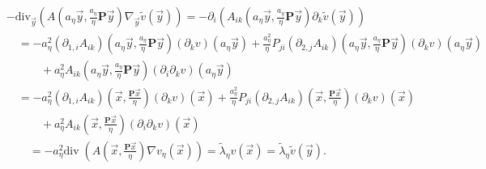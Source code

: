 \documentclass[a4paper,reqno]{amsart}
\numberwithin{equation}{section}
\numberwithin{equation}{section}		%
\numberwithin{figure}{section}			%
\numberwithin{table}{section}				%
\newcommand{\ntodo}[1]{\todo[inline, backgroundcolor=blue!20!white, bordercolor=blue]{Niklas: #1}}
\theoremstyle{definition}
\renewcommand{\tilde}{\widetilde}
\newcommand{\<}{\ensuremath \leq}
\renewcommand{\>}{\ensuremath \geq}
\renewcommand{\tilde}{\widetilde}
\begin{document}
\begin{align*}
    &-\mathrm{div}_{\vec y}\left(A(a_\eta \vec y, \frac{a_\eta}{\eta}\textbf{P}\vec y) \nabla_{\vec y} \tilde{v}(\vec{y})\right) = -  \partial_{i}(A_{ik}(a_\eta \vec y, \frac{a_\eta}{\eta}\textbf{P}\vec y)\partial_{k}\tilde{v}(\vec{y}))\\   
    &\quad =-  a_\eta^2 (\partial_{1,i}A_{ik})(a_\eta \vec y, \frac{a_\eta}{\eta}\textbf{P}\vec y)(\partial_kv)(a_\eta\vec y)
    +  \frac{a_\eta^2}{\eta}  P_{ji}(\partial_{2,j}A_{ik})(a_\eta \vec y, \frac{a_\eta}{\eta}\textbf{P}\vec y)(\partial_kv)(a_\eta\vec y)\\
    &\quad \qquad + a_\eta^2 A_{ik}(a_\eta \vec y, \frac{a_\eta}{\eta}\textbf{P}\vec y)(\partial_i\partial_k v)(a_\eta \vec y)\\
    &\quad =-  a_\eta^2 (\partial_{1,i}A_{ik})(\vec x, \frac{\textbf{P}\vec x}{\eta})(\partial_kv)(\vec x)
    +  \frac{a_\eta^2}{\eta}  P_{ji}(\partial_{2,j}A_{ik})(\vec x, \frac{\textbf{P}\vec x}{\eta})(\partial_kv)(\vec x)\\
    &\quad \qquad + a_\eta^2 A_{ik}(\vec x, \frac{\textbf{P}\vec x}{\eta})(\partial_i\partial_k v)(\vec x)\\
    &\qquad =-a_\eta^{2}\mathrm{div} \; \left( A\left( \vec{x}, \frac{\textbf{P} \vec{x}}{\eta} \right) \nabla v_\eta({\vec x}) \right )= \tilde{\lambda}_\eta v(\vec x)=\tilde{\lambda}_\eta \tilde{v}(\vec y).
\end{align*}
\end{document}
